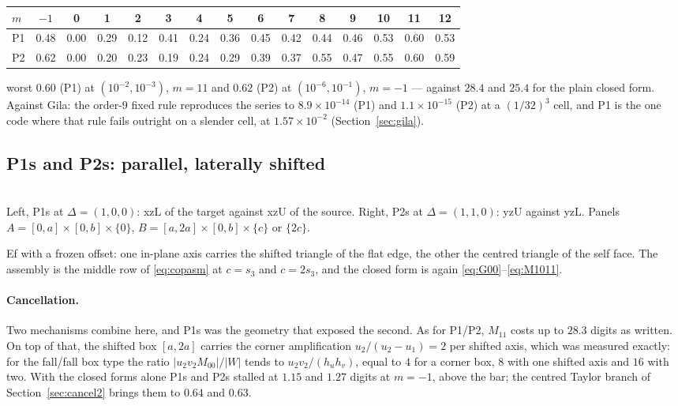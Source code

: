 \documentclass[11pt]{article}
\theoremstyle{remark}
\newcommand{\geofig}[2]{\begin{center}#1\\[2pt]{\footnotesize #2}\end{center}}
\begin{document}
\begin{center}\small
\begin{tabular}{@{}lcccccccccccccc@{}}
\toprule
$m$ & $-1$ & 0 & 1 & 2 & 3 & 4 & 5 & 6 & 7 & 8 & 9 & 10 & 11 & 12\\
\midrule
P1 & 0.48 & 0.00 & 0.29 & 0.12 & 0.41 & 0.24 & 0.36 & 0.45 & 0.42 & 0.44 & 0.46 & 0.53 & 0.60 & 0.53\\
P2 & 0.62 & 0.00 & 0.20 & 0.23 & 0.19 & 0.24 & 0.29 & 0.39 & 0.37 & 0.55 & 0.47 & 0.55 & 0.60 & 0.59\\
\bottomrule
\end{tabular}
\end{center}
\noindent
worst $0.60$ (P1) at $(10^{-2}, 10^{-3})$, $m = 11$ and $0.62$ (P2) at
$(10^{-6}, 10^{-1})$, $m = -1$ --- against $28.4$ and $25.4$ for the plain closed form.
Against Gila: the order-9 fixed rule reproduces the series to $8.9\times10^{-14}$ (P1) and
$1.1\times10^{-15}$ (P2) at a $(1/32)^3$ cell, and P1 is the one code where that rule
fails outright on a slender cell, at $1.57\times10^{-2}$ (Section~\ref{sec:gila}).

\subsection{P1s and P2s: parallel, laterally shifted}
\label{sec:P12s}

\geofig{\figPas\qquad\figPbs}{Left, P1s at $\Delta = (1,0,0)$: xzL of the target against
xzU of the source. Right, P2s at $\Delta = (1,1,0)$: yzU against yzL. Panels
$A = [0,a]\times[0,b]\times\{0\}$, $B = [a,2a]\times[0,b]\times\{c\}$ or $\{2c\}$.}

Ef with a frozen offset: one in-plane axis carries the shifted triangle of the flat edge,
the other the centred triangle of the self face. The assembly is the middle row of
\eqref{eq:copasm} at $c = s_3$ and $c = 2s_3$, and the closed form is again
\eqref{eq:G00}--\eqref{eq:M1011}.

\paragraph{Cancellation.} Two mechanisms combine here, and P1s was the geometry that
exposed the second. As for P1/P2, $M_{11}$ costs up to $28.3$ digits as written. On top of
that, the shifted box $[a,2a]$ carries the corner amplification $u_2/(u_2-u_1) = 2$ per
shifted axis, which was measured exactly: for the fall/fall box type the ratio
$|u_2v_2M_{00}|/|W|$ tends to $u_2v_2/(h_uh_v)$, equal to $4$ for a corner box, $8$ with
one shifted axis and $16$ with two. With the closed forms alone P1s and P2s stalled at
$1.15$ and $1.27$ digits at $m = -1$, above the bar; the centred Taylor branch of
Section~\ref{sec:cancel2} brings them to $0.64$ and $0.63$.
\end{document}
